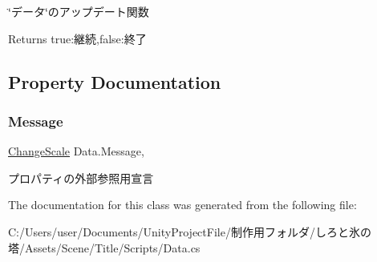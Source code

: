 \char`\"{}データ\char`\"{}のアップデート関数 

\begin{DoxyReturn}{Returns}
true\+:継続,false\+:終了
\end{DoxyReturn}


\subsection{Property Documentation}
\mbox{\label{class_data_aaf5b5290f19865c3098f8b46a70947ea}} 
\subsubsection{\texorpdfstring{Message}{Message}}
{\footnotesize\ttfamily \hyperlink{class_change_scale}{Change\+Scale} Data.\+Message\hspace{0.3cm}{\ttfamily [get]}, {}}



プロパティの外部参照用宣言 



The documentation for this class was generated from the following file\+:\begin{DoxyCompactItemize}
\item 
C\+:/\+Users/user/\+Documents/\+Unity\+Project\+File/制作用フォルダ/しろと氷の塔/\+Assets/\+Scene/\+Title/\+Scripts/Data.\+cs\end{DoxyCompactItemize}
